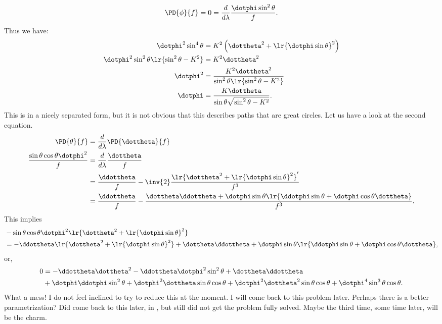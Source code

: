 {%
\begin{equation}\label{eqn:goldsteinCh12:1380}
\PD{\phi}{f} = 0 = \frac{d}{d\lambda} \frac{\dotphi \sin^2\theta}{f}.
\end{equation}
%
Thus we have:
\begin{equation}\label{eqn:goldsteinCh12:820}
\begin{aligned}
\dotphi^2 \sin^4\theta &= K^2 \left(\dottheta^2 +
\lr{  \dotphi \sin\theta  }^2
 \right) \\
\dotphi^2 \sin^2\theta
\lr{  \sin^2\theta - K^2  }
 &= K^2 \dottheta^2 \\
\dotphi^2
&= \frac{K^2 \dottheta^2 }{ \sin^2\theta
\lr{  \sin^2\theta - K^2  } } \\
\dotphi
&= \frac{K \dottheta }{ \sin\theta \sqrt{ \sin^2\theta - K^2 } } .
\end{aligned}
\end{equation}
%
This is in a nicely separated form, but it is not obvious that this describes paths that are great circles.
%
Let us have a look at the second equation.
\begin{equation}\label{eqn:goldsteinCh12:840}
\begin{aligned}
\PD{\theta}{f} &= \frac{d}{d\lambda} \PD{\dottheta}{f} \\
\frac{\sin\theta\cos\theta \dotphi^2}{f}
&= \frac{d}{d\lambda} \frac{\dottheta}{f} \\
&= \frac{\ddottheta}{f} - \inv{2} \frac{
\lr{ \dottheta^2 + \lr{  \dotphi \sin\theta  }^2 }'
 }{f^3} \\
&= \frac{\ddottheta}{f} - \frac{ \dottheta \ddottheta + \dotphi \sin\theta
\lr{  \ddotphi \sin\theta + \dotphi \cos\theta \dottheta  }
}{f^3}.
\end{aligned}
\end{equation}
This implies
\begin{equation}\label{eqn:goldsteinCh12:1400}
\begin{aligned}
&-\sin\theta\cos\theta \dotphi^2
\lr{  \dottheta^2 + \lr{  \dotphi \sin\theta  }^2  } \\
&= -\ddottheta
\lr{  \dottheta^2 + \lr{  \dotphi \sin\theta  }^2  }
   + \dottheta \ddottheta
   + \dotphi \sin\theta
\lr{  \ddotphi \sin\theta + \dotphi \cos\theta \dottheta  },
\end{aligned}
\end{equation}
%
or,
\begin{equation}\label{eqn:goldsteinCh12:1420}
\begin{aligned}
0 &=
- \ddottheta \dottheta^2
- \ddottheta \dotphi^2 \sin^2\theta
+ \dottheta \ddottheta \\
&
+ \dotphi \ddotphi \sin^2\theta
+ \dotphi^2 \dottheta \sin\theta \cos\theta
+ \dotphi^2 \dottheta^2 \sin\theta \cos\theta
+ \dotphi^4 \sin^3\theta \cos\theta.
\end{aligned}
\end{equation}
%
What a mess!  I do not feel inclined to try to reduce this at the moment.  I will come back to this problem later.  Perhaps there is a better parametrization?
%
Did come back to this later, in \citep{miscphysics:PJbyronFullerCalcVarProblems}, but
still did not get the problem fully solved.  Maybe the third time, some time
later, will be the charm.
}
%

